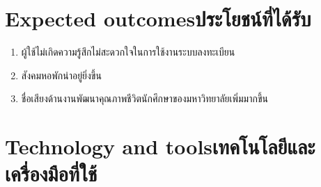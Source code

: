 \section{\ifenglish Expected outcomes\else ประโยชน์ที่ได้รับ\fi}
\begin{enumerate}
    \item ผู้ใช้ไม่เกิดความรู้สึกไม่สะดวกใจในการใช้งานระบบลงทะเบียน
    \item สังคมหอพักน่าอยู่ยิ่งขึ้น
    \item ชื่อเสียงด้านงานพัฒนาคุณภาพชีวิตนักศึกษาของมหาวิทยาลัยเพิ่มมากขึ้น
\end{enumerate}

\section{\ifenglish Technology and tools\else เทคโนโลยีและเครื่องมือที่ใช้\fi}



